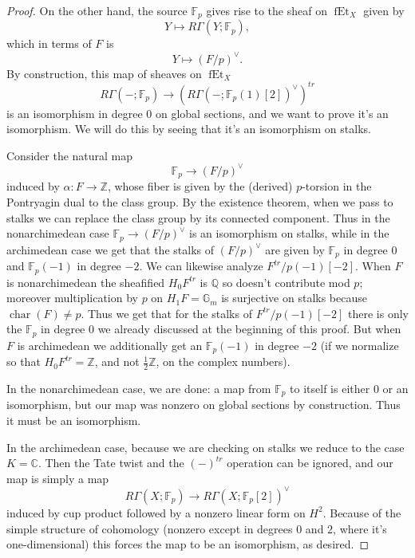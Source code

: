 \documentclass[12pt]{article}
\theoremstyle{definition}
\newcommand{\on}{\operatorname}
\newcommand{\mbb}{\mathbb}
\begin{document}
\begin{proof}
On the other hand, the source $\mbb{F}_p$ gives rise to the sheaf on $\on{fEt}_X$ given by
$$Y\mapsto R\Gamma(Y;\mbb{F}_p),$$
which in terms of $F$ is
$$Y\mapsto (F/p)^\vee.$$
By construction, this map of sheaves on $\on{fEt}_X$
$$R\Gamma(-;\mbb{F}_p) \to (R\Gamma(-;\mbb{F}_p(1)[2])^\vee)^{tr}$$
is an isomorphism in degree $0$ on global sections, and we want to prove it's an isomorphism.  We will do this by seeing that it's an isomorphism on stalks.

Consider the natural map
$$\mbb{F}_p \to (F/p)^\vee$$
induced by $\alpha:F\to\mbb{Z}$, whose fiber is given by the (derived) $p$-torsion in the Pontryagin dual to the class group.  By the existence theorem, when we pass to stalks we can replace the class group by its connected component.  Thus in the nonarchimedean case $\mbb{F}_p \to (F/p)^\vee$ is an isomorphism on stalks, while in the archimedean case we get that the stalks of $(F/p)^\vee$ are given by $\mbb{F}_p$ in degree $0$ and $\mbb{F}_p(-1)$ in degree $-2$.  We can likewise analyze $F^{tr}/p(-1)[-2]$.  When $F$ is nonarchimedean the sheafified $H_0F^{tr}$ is $\mbb{Q}$ so doesn't contribute mod $p$; moreover multiplication by $p$ on $H_1F=\mbb{G}_m$ is surjective on stalks because $\on{char}(F)\neq p$.  Thus we get that for the stalks of $F^{tr}/p(-1)[-2]$ there is only the $\mbb{F}_p$ in degree $0$ we already discussed at the beginning of this proof.  But when $F$ is archimedean we additionally get an $\mbb{F}_p(-1)$ in degree $-2$ (if we normalize so that $H_0F^{tr}=\mbb{Z}$, and not $\frac{1}{2}\mbb{Z}$, on the complex numbers).

In the nonarchimedean case, we are done: a map from $\mbb{F}_p$ to itself is either $0$ or an isomorphism, but our map was nonzero on global sections by construction.  Thus it must be an isomorphism.

In the archimedean case, because we are checking on stalks we reduce to the case $K=\mbb{C}$.  Then the Tate twist and the $(-)^{tr}$ operation can be ignored, and our map is simply a map
$$R\Gamma(X;\mbb{F}_p) \to R\Gamma(X;\mbb{F}_p[2])^\vee$$
induced by cup product followed by a nonzero linear form on $H^2$.  Because of the simple structure of cohomology (nonzero except in degrees $0$ and $2$, where it's one-dimensional) this forces the map to be an isomorphism, as desired.


\end{proof}
\end{document}
